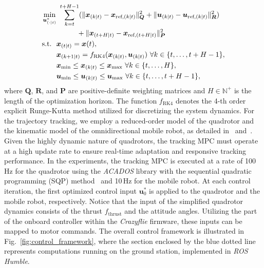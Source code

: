 \documentclass[conference,preprint]{IEEEtran}
\begin{document}
\begin{equation}
  \label{eq:mpc_formulation}
  \begin{aligned}
    \min_{\bm{u}^*_{(\cdot\mid t)}} & \ \sum_{k=t}^{t+H-1}  (\| \bm{x}_{(k\mid t)} - \bm{x}_{\text{ref},(k\mid t)} \|_{\bm{Q}}^2 + \| \bm{u}_{(k\mid t)} - \bm{u}_{\text{ref},(k\mid t)} \|_{\bm{R}}^2) \\
                                                  & \hspace{10mm} + \| \bm{x}_{(t+H\mid t)} - \bm{x}_{\text{ref},(t+H\mid t)} \|_{\bm{P}}^2  \\
    \text{s.t.} \ \
    & \bm{x}_{(t\mid t)} = \bm{x}(t), \\
    & \bm{x}_{(k+1\mid t)} = f_{\text{RK4}}(\bm{x}_{(k\mid t)}, \bm{u}_{(k\mid t)}) \ \forall k \in \{t, \ldots, t+H-1\}, \\
    & \bm{x}_{\text{min}} \leq \bm{x}_{(k\mid t)} \leq \bm{x}_{\text{max}} \ \forall k \in \{t, \ldots, H\}, \\
    & \bm{u}_{\text{min}} \leq \bm{u}_{(k\mid t)} \leq \bm{u}_{\text{max}} \ \forall k \in \{t, \ldots, t+H-1\},
  \end{aligned}
\end{equation}
where $\bm{Q}$, $\bm{R}$, and $\bm{P}$ are positive-definite weighting matrices and $H \in \mathbb{N}^+$ is the length of the optimization horizon. The function $f_\text{RK4}$ denotes the 4-th order explicit Runge-Kutta method utilized for discretizing the system dynamics. 
For the trajectory tracking, we employ a reduced-order model of the quadrotor and the kinematic model of the omnidirectional mobile robot, as detailed in~\cite{Llanes2024} and~\cite{Eschmann2023}. 
Given the highly dynamic nature of quadrotors, the tracking MPC must operate at a high update rate to ensure real-time adaptation and responsive tracking performance. In the experiments, the tracking MPC is executed at a rate of 100\,Hz for the quadrotor using the \textit{ACADOS} library with the sequential quadratic programming (SQP) method~\cite{Verschueren2021} and 10\,Hz for the mobile robot. 
At each control iteration, the first optimized control input $\bm{u}^*_{0}$ is applied to the quadrotor and the mobile robot, respectively. 
Notice that the input of the simplified quadrotor dynamics consists of the thrust $f_{\text{thrust}}$ and the attitude angles. Utilizing the part of the onboard controller within the \textit{Crazyflie} firmware, these inputs can be mapped to motor commands. The overall control framework is illustrated in Fig.~\ref{fig:control_framework}, where the section enclosed by the blue dotted line represents computations running on the ground station, implemented in \textit{ROS Humble}.
\end{document}
